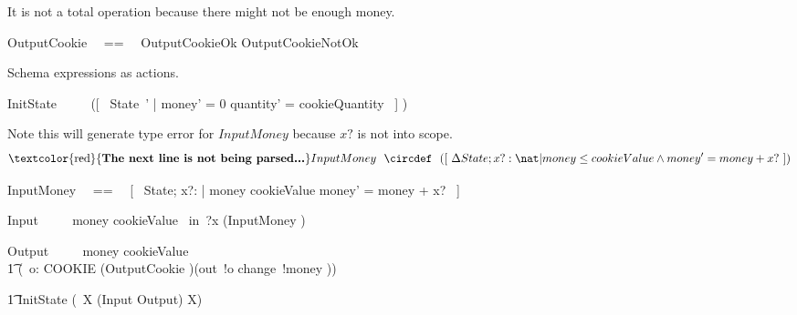 \documentclass{article}
\newcommand{\lschexpract}{(}
\newcommand{\rschexpract}{)}
\begin{document}
It is not a total operation because there might not be enough money.
%
\begin{zed}
   OutputCookie ~~==~~ OutputCookieOk \lor OutputCookieNotOk
\end{zed}

Schema expressions as actions.
%
\begin{circusaction}
    InitState ~~\circdef~~ \lschexpract [~ State~' | money' = 0 \land quantity' = cookieQuantity ~] \rschexpract
\end{circusaction}

Note this will generate type error for $InputMoney$ because $x?$ is not into scope.
%
\[
\mbox{\textcolor{red}{\textbf{The next line is not being parsed...}}}
    InputMoney ~~\circdef~~ \lschexpract [~ \Delta State; x?: \nat | money \leq cookieValue \land money' = money + x? ~] \rschexpract
\]
%
\begin{zed}
    InputMoney ~~==~~ [~ \Delta State; x?: \nat | money \leq cookieValue \land money' = money + x? ~]
\end{zed}

\begin{circusaction}
   Input ~~\circdef~~ \lcircguard money \leq cookieValue \rcircguard  \circguard\ in~?x \then \lschexpract InputMoney \rschexpract \\
\end{circusaction}

\begin{circusaction}
    Output ~~\circdef~~ \lcircguard money \geq cookieValue \rcircguard \circguard\ \\
        \t1 (\circvar\ o: COOKIE \circspot \lschexpract OutputCookie \rschexpract \circseq (out~!o \then change~!money \then \Skip))
\end{circusaction}


\begin{circusaction}
   \t1 \circspot InitState \circseq (\circmu\ X \circspot (Input \extchoice Output) \circseq X)
\end{circusaction}

\begin{circus}
   \circend
\end{circus}
\end{document}
